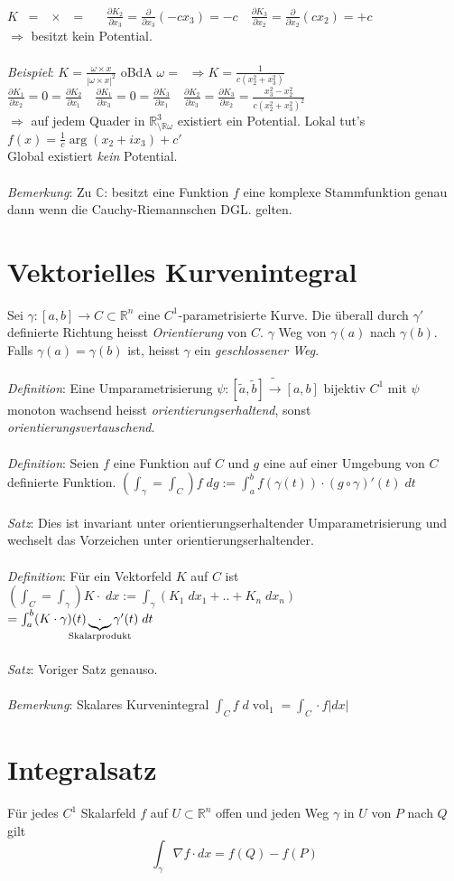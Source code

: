 \documentclass[12pt,a4paper,titlepage]{article}
\renewcommand{\arg}{\operatorname{arg}}
\renewcommand{\d}{\partial}
\newcommand{\setC}{\mathbb{C}}
\newcommand{\setR}{\mathbb{R}}
\newcommand{\vol}{\operatorname{vol}}
\newcommand{\threevec}[3]{\mathop{\left(\substack{#1 \\ #2 \\ #3}\right)}}
\begin{document}
$K\threevec{x_1}{x_2}{x_3}=\threevec{c}{0}{0}\times\threevec{x_1}{x_2}{x_3} = \threevec{0}{-cx_3}{cx_2} \quad \frac{\d K_2}{\d x_3}=\frac{\d}{\d x_3}(-cx_3)=-c \quad \frac{\d K_3}{\d x_2}=\frac{\d}{\d x_2}(cx_2)=+c$ \\
$\Rightarrow$ besitzt kein Potential. \\
\\
\textit{Beispiel}: $K=\frac{\omega\times x}{|\omega\times x|^2}$ oBdA $\omega=\threevec{c}{0}{0} \Rightarrow K=\frac{1}{c(x_2^2+x_3^2)}\threevec{0}{-x_3}{+x_2}$ \\
$\frac{\d K_1}{\d x_2}=0=\frac{\d K_2}{\d x_1} \quad \frac{\d K_1}{\d x_3}=0=\frac{\d K_3}{\d x_1} \quad \frac{\d K_2}{\d x_3}=\frac{\d K_3}{\d x_2}=\frac{x_3^2-x_2^2}{c(x_2^2+x_3^2)^2}$ \\
$\Rightarrow$ auf jedem Quader in $\setR^3_{\setminus\setR\omega}$ existiert ein Potential. Lokal tut's $f(x)=\frac{1}{c}\arg(x_2+ix_3)+c'$ \\
Global existiert \emph{kein} Potential. \\
\\
\textit{Bemerkung}: Zu $\setC$: besitzt eine Funktion $f$ eine komplexe Stammfunktion genau dann wenn die Cauchy-Riemannschen DGL. gelten.

\section*{Vektorielles Kurvenintegral}
Sei $\gamma:[a,b]\to C\subset\setR^n$ eine $C^1$-parametrisierte Kurve. Die überall durch $\gamma'$ definierte Richtung heisst \emph{Orientierung} von $C$. $\gamma$ Weg von $\gamma(a)$ nach $\gamma(b)$. Falls $\gamma(a)=\gamma(b)$ ist, heisst $\gamma$ ein \emph{geschlossener Weg}. \\
\\
\textit{Definition}: Eine Umparametrisierung $\psi:[\widetilde{a},\widetilde{b}]\tilde{\to}[a,b]$ bijektiv $C^1$ mit $\psi$ monoton wachsend heisst \emph{orientierungserhaltend}, sonst \emph{orientierungsvertauschend}. \\
\\
\textit{Definition}: Seien $f$ eine Funktion auf $C$ und $g$ eine auf einer Umgebung von $C$ definierte Funktion. $(\int_\gamma=\int_C)f \;dg := \int_a^bf(\gamma(t))\cdot (g\circ\gamma)'(t) \;dt$ \\
\\
\textit{Satz}: Dies ist invariant unter orientierungserhaltender Umparametrisierung und wechselt das Vorzeichen unter orientierungserhaltender. \\
\\
\textit{Definition}: Für ein Vektorfeld $K$ auf $C$ ist $(\int_C=\int_\gamma) K\cdot \;dx:=\int_\gamma(K_1 \;dx_1+..+K_n \;dx_n)$ \\
$=\int_a^b(K\cdot\gamma)(t)\underbrace{\cdot}_{\mathclap{\text{Skalarprodukt}}}\gamma'(t) \;dt$ \\
\\
\textit{Satz}: Voriger Satz genauso. \\
\\
\textit{Bemerkung}: Skalares Kurvenintegral $\int_Cf \;d\vol_1=\int_C\cdot f|dx|$

\section*{Integralsatz}
Für jedes $C^1$ Skalarfeld $f$ auf $U\subset\setR^n$ offen und jeden Weg $\gamma$ in $U$ von $P$ nach $Q$ gilt
$$\int_\gamma\nabla f\cdot dx = f(Q)-f(P)$$
\end{document}
